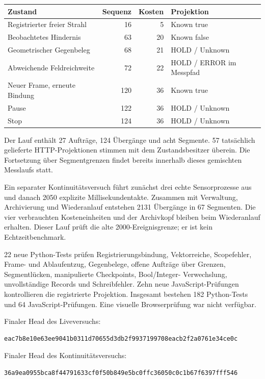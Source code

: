 \documentclass[11pt,a4paper]{article}
\begin{document}
\begin{center}\begin{tabular}{@{}lrrl@{}}\toprule
Zustand & Sequenz & Kosten & Projektion\\\midrule
Registrierter freier Strahl & 16 & 5 & Known true\\
Beobachtetes Hindernis & 63 & 20 & Known false\\
Geometrischer Gegenbeleg & 68 & 21 & HOLD / Unknown\\
Abweichende Feldreichweite & 72 & 22 & HOLD / ERROR im Messpfad\\
Neuer Frame, erneute Bindung & 120 & 36 & Known true\\
Pause & 122 & 36 & HOLD / Unknown\\
Stop & 124 & 36 & HOLD / Unknown\\\bottomrule
\end{tabular}\end{center}

Der Lauf enthält 27 Aufträge, 124 Übergänge und acht Segmente.
57 tatsächlich gelieferte HTTP-Projektionen stimmen mit dem
Zustandsbesitzer überein. Die Fortsetzung über Segmentgrenzen
findet bereits innerhalb dieses gemischten Messlaufs statt.

Ein separater Kontinuitätsversuch führt zunächst drei echte
Sensorprozesse aus und danach 2050 explizite Millisekundentakte.
Zusammen mit Verwaltung, Archivierung und Wiederanlauf entstehen
2131 Übergänge in 67 Segmenten. Die vier verbrauchten Kosteneinheiten
und der Archivkopf bleiben beim Wiederanlauf erhalten. Dieser Lauf
prüft die alte 2000-Ereignisgrenze; er ist kein Echtzeitbenchmark.

22 neue Python-Tests prüfen Registrierungsbindung, Vektorreiche,
Scopefehler, Frame- und Ablaufentzug, Gegenbelege, offene Aufträge
über Grenzen, Segmentlücken, manipulierte Checkpoints, Bool/Integer-
Verwechslung, unvollständige Records und Schreibfehler. Zehn neue
JavaScript-Prüfungen kontrollieren die registrierte Projektion.
Insgesamt bestehen 182 Python-Tests und 64 JavaScript-Prüfungen.
Eine visuelle Browserprüfung war nicht verfügbar.

Finaler Head des Liveversuchs:
\begin{lstlisting}
eac7b8e10e63ee9041b0311d70655d3db2f9937199708eacb2f2a0761e34ce0c
\end{lstlisting}
Finaler Head des Kontinuitätsversuchs:
\begin{lstlisting}
36a9ea0955bca8f44791633cf0f50b849e5bc0ffc36050c0c1b67f6397fff546
\end{lstlisting}
\end{document}
